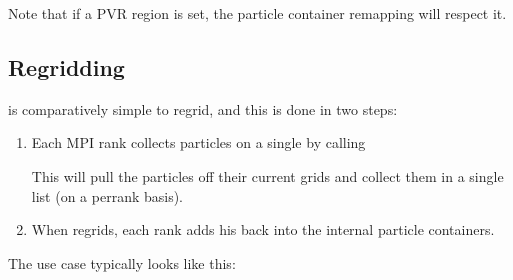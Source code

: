\documentclass[letterpaper,10pt,english]{sphinxmanual}
\begin{document}
\begin{sphinxVerbatim}[commandchars=\\\{\},formatcom=\scriptsize]
 

\end{sphinxVerbatim}

Note that if a PVR region is set, the particle container remapping will respect it.


\subsection{Regridding}
\label{\detokenize{Source/Particles:regridding}}
 is comparatively simple to regrid, and this is done in two steps:
\begin{enumerate}
%
\item {} 
Each MPI rank collects  particles on a single  by calling

\begin{sphinxVerbatim}[commandchars=\\\{\},formatcom=\scriptsize]
  
\end{sphinxVerbatim}

This will pull the particles off their current grids and collect them in a single list (on a per\sphinxhyphen{}rank basis).

\item {} 
When  regrids, each rank adds his  back into the internal particle containers.

\end{enumerate}

The use case typically looks like this:
\end{document}
